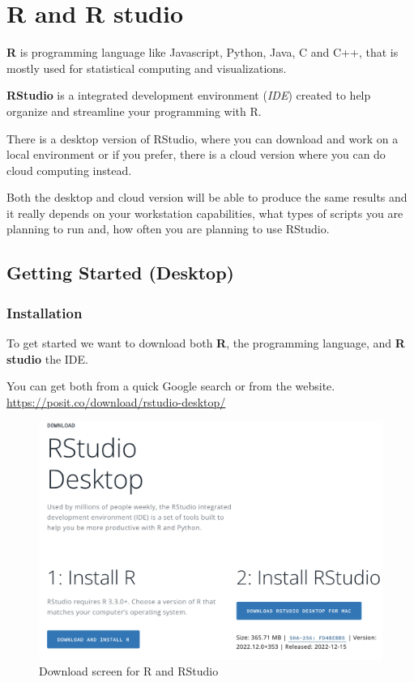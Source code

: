 \documentclass[
]{book}
\begin{document}
\hypertarget{r-and-r-studio}{%
\chapter{R and R studio}\label{r-and-r-studio}}

\textbf{R} is programming language like Javascript, Python, Java, C and C++, that is mostly used for statistical computing and visualizations.

\textbf{RStudio} is a integrated development environment (\emph{IDE}) created to help organize and streamline your programming with R.

There is a desktop version of RStudio, where you can download and work on a local environment or if you prefer, there is a cloud version where you can do cloud computing instead.

Both the desktop and cloud version will be able to produce the same results and it really depends on your workstation capabilities, what types of scripts you are planning to run and, how often you are planning to use RStudio.

\hypertarget{getting-started-desktop}{%
\section{Getting Started (Desktop)}\label{getting-started-desktop}}

\hypertarget{installation}{%
\subsection{Installation}\label{installation}}

To get started we want to download both \textbf{R}, the programming language, and \textbf{R studio} the IDE.

You can get both from a quick Google search or from the website. \url{https://posit.co/download/rstudio-desktop/}

\begin{figure}
\includegraphics[width=14.71in]{images/2.1rdownload} \caption{Download screen for R and RStudio}\label{fig:unnamed-chunk-2}
\end{figure}
\end{document}
